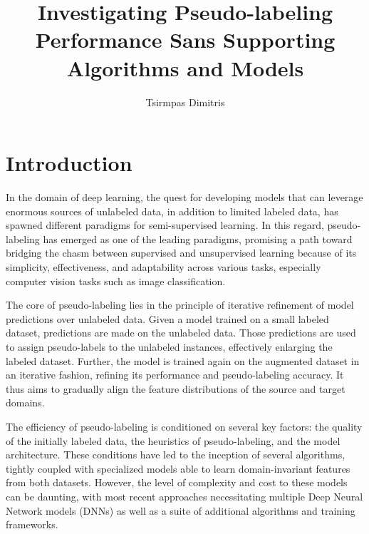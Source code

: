 \documentclass{article}
\title{\Huge Investigating Pseudo-labeling Performance Sans Supporting Algorithms and Models}
\author{\LARGE Tsirmpas Dimitris}
\begin{document}
	\begin{titlepage}
		\maketitle
		\thispagestyle{empty} %
			
	\end{titlepage}
	
	\maketitle
	
	
	\section{Introduction}
	
	In the domain of deep learning, the quest for developing models that can leverage enormous sources of unlabeled data, in addition to limited labeled data, has spawned different paradigms for semi-supervised learning. In this regard, pseudo-labeling has emerged as one of the leading paradigms, promising a path toward bridging the chasm between supervised and unsupervised learning because of its simplicity, effectiveness, and adaptability across various tasks, especially computer vision tasks such as image classification. 
	
	The core of pseudo-labeling lies in the principle of iterative refinement of model predictions over unlabeled data. Given a model trained on a small labeled dataset, predictions are made on the unlabeled data. Those predictions are used to assign pseudo-labels to the unlabeled instances, effectively enlarging the labeled dataset. Further, the model is trained again on the augmented dataset in an iterative fashion, refining its performance and pseudo-labeling accuracy. It thus aims to gradually align the feature distributions of the source and target domains.
	
	The efficiency of pseudo-labeling is conditioned on several key factors: the quality of the initially labeled data, the heuristics of pseudo-labeling, and the model architecture. These conditions have led to the inception of several algorithms, tightly coupled with specialized models able to learn domain-invariant features from both datasets. However, the level of complexity and cost to these models can be daunting, with most recent approaches necessitating multiple Deep Neural Network models (DNNs) as well as a suite of additional algorithms and training frameworks. 
	
\end{document}
